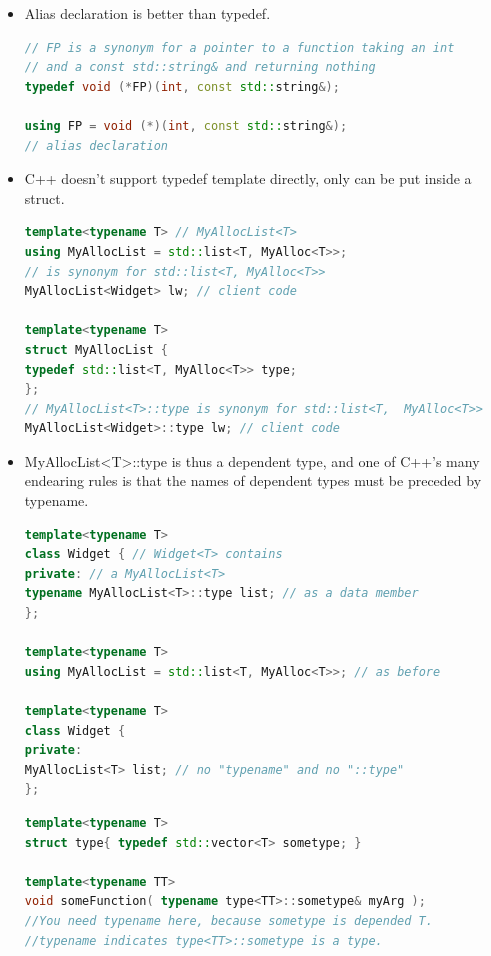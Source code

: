 \documentclass[a4paper,12pt,twoside]{book}
\begin{document}
\begin{itemize}
\item Alias declaration is better than typedef.
\begin{lstlisting}[frame=single, language=c++]
// FP is a synonym for a pointer to a function taking an int
// and a const std::string& and returning nothing
typedef void (*FP)(int, const std::string&);

using FP = void (*)(int, const std::string&);
// alias declaration
\end{lstlisting}

\item C++ doesn't support typedef template directly, only can be put inside a struct.
\begin{lstlisting}[frame=single, language=c++]
template<typename T> // MyAllocList<T>
using MyAllocList = std::list<T, MyAlloc<T>>;
// is synonym for std::list<T, MyAlloc<T>>
MyAllocList<Widget> lw; // client code

template<typename T>
struct MyAllocList {
typedef std::list<T, MyAlloc<T>> type;
};
// MyAllocList<T>::type is synonym for std::list<T,  MyAlloc<T>>
MyAllocList<Widget>::type lw; // client code
\end{lstlisting}

\item MyAllocList<T>::type is thus a dependent type, and one of C++'s many endearing rules is that the names of dependent types must be preceded by typename.

\begin{lstlisting}[frame=single, language=c++]
template<typename T>
class Widget { // Widget<T> contains
private: // a MyAllocList<T>
typename MyAllocList<T>::type list; // as a data member
};

template<typename T>
using MyAllocList = std::list<T, MyAlloc<T>>; // as before

template<typename T>
class Widget {
private:
MyAllocList<T> list; // no "typename" and no "::type"
};
\end{lstlisting}




\begin{lstlisting}[frame=single, language=c++]
template<typename T>
struct type{ typedef std::vector<T> sometype; }

template<typename TT>
void someFunction( typename type<TT>::sometype& myArg );
//You need typename here, because sometype is depended T.
//typename indicates type<TT>::sometype is a type.


\end{lstlisting}
\end{itemize}
\end{document}
